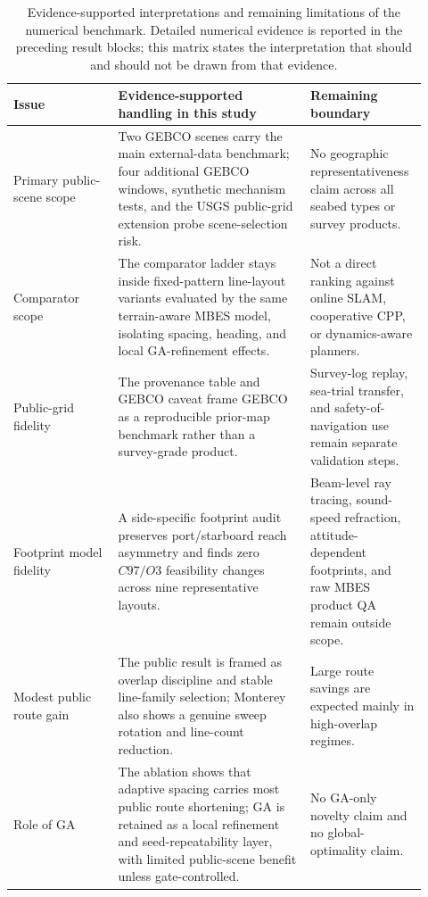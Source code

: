 \documentclass[jmse,article,submit,moreauthors]{Definitions/mdpi}
\begin{document}
\begin{table}[!htbp]
	\centering
	\caption{Evidence-supported interpretations and remaining limitations of the numerical benchmark. Detailed numerical evidence is reported in the preceding result blocks; this matrix states the interpretation that should and should not be drawn from that evidence.}
	\label{tab:reviewer_risk_matrix}
	\scriptsize
	\renewcommand{\arraystretch}{1.10}
	\setlength{\tabcolsep}{3.4pt}
	\begin{tabular}{@{}>{\raggedright\arraybackslash}p{0.24\linewidth}>{\raggedright\arraybackslash}p{0.44\linewidth}>{\raggedright\arraybackslash}p{0.24\linewidth}@{}}
		\toprule[1bp]
		\textbf{Issue} & \textbf{Evidence-supported handling in this study} & \textbf{Remaining boundary} \\
		\midrule[1bp]
		Primary public-scene scope & Two GEBCO scenes carry the main external-data benchmark; four additional GEBCO windows, synthetic mechanism tests, and the USGS public-grid extension probe scene-selection risk. & No geographic representativeness claim across all seabed types or survey products. \\
		Comparator scope & The comparator ladder stays inside fixed-pattern line-layout variants evaluated by the same terrain-aware MBES model, isolating spacing, heading, and local GA-refinement effects. & Not a direct ranking against online SLAM, cooperative CPP, or dynamics-aware planners. \\
		Public-grid fidelity & The provenance table and GEBCO caveat frame GEBCO as a reproducible prior-map benchmark rather than a survey-grade product. & Survey-log replay, sea-trial transfer, and safety-of-navigation use remain separate validation steps. \\
		Footprint model fidelity & A side-specific footprint audit preserves port/starboard reach asymmetry and finds zero \(C97/O3\) feasibility changes across nine representative layouts. & Beam-level ray tracing, sound-speed refraction, attitude-dependent footprints, and raw MBES product QA remain outside scope. \\
		Modest public route gain & The public result is framed as overlap discipline and stable line-family selection; Monterey also shows a genuine sweep rotation and line-count reduction. & Large route savings are expected mainly in high-overlap regimes. \\
		Role of GA & The ablation shows that adaptive spacing carries most public route shortening; GA is retained as a local refinement and seed-repeatability layer, with limited public-scene benefit unless gate-controlled. & No GA-only novelty claim and no global-optimality claim. \\

\end{tabular}
\end{table}
\end{document}
